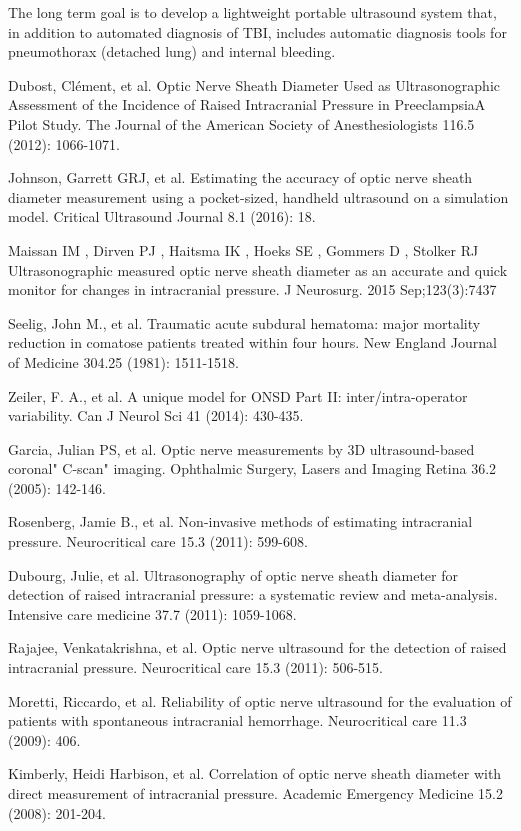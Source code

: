 \documentclass{llncs}
\begin{document}
The long term goal is to develop a lightweight portable ultrasound
system that, in addition to automated diagnosis of TBI, includes automatic
diagnosis tools for pneumothorax (detached lung) and internal bleeding.

%
%
\begin{thebibliography}{}
%
Dubost, Clément, et al. 
Optic Nerve Sheath Diameter Used as Ultrasonographic Assessment of the Incidence
of Raised Intracranial Pressure in PreeclampsiaA Pilot Study.  
The Journal of the American Society of Anesthesiologists 116.5 (2012): 1066-1071.

Johnson, Garrett GRJ, et al. 
Estimating the accuracy of optic nerve sheath diameter measurement using a
pocket-sized, handheld ultrasound on a simulation model.  Critical Ultrasound
Journal 8.1 (2016): 18.

Maissan IM , Dirven PJ , Haitsma IK , Hoeks SE , Gommers D , Stolker RJ 
Ultrasonographic measured optic nerve sheath diameter as an accurate and quick
monitor for changes in intracranial pressure. 
J Neurosurg. 2015 Sep;123(3):7437

Seelig, John M., et al. 
Traumatic acute subdural hematoma: major mortality reduction in comatose
patients treated within four hours.
New England Journal of Medicine 304.25 (1981): 1511-1518.

Zeiler, F. A., et al. 
A unique model for ONSD Part II: inter/intra-operator variability. 
Can J Neurol Sci 41 (2014): 430-435.

Garcia, Julian PS, et al. 
Optic nerve measurements by 3D ultrasound-based coronal" C-scan" imaging.
Ophthalmic Surgery, Lasers and Imaging Retina 36.2 (2005): 142-146.

Rosenberg, Jamie B., et al. 
Non-invasive methods of estimating intracranial pressure.
Neurocritical care 15.3 (2011): 599-608.

Dubourg, Julie, et al. 
Ultrasonography of optic nerve sheath diameter for detection of raised
intracranial pressure: a systematic review and meta-analysis.
Intensive care medicine 37.7 (2011): 1059-1068.

Rajajee, Venkatakrishna, et al. 
Optic nerve ultrasound for the detection of raised intracranial pressure. 
Neurocritical care 15.3 (2011): 506-515.

Moretti, Riccardo, et al. 
Reliability of optic nerve ultrasound for the evaluation of patients with
spontaneous intracranial hemorrhage.
Neurocritical care 11.3 (2009): 406.

Kimberly, Heidi Harbison, et al. 
Correlation of optic nerve sheath diameter with direct measurement of
intracranial pressure.
Academic Emergency Medicine 15.2 (2008): 201-204.

\end{thebibliography}
\end{document}
